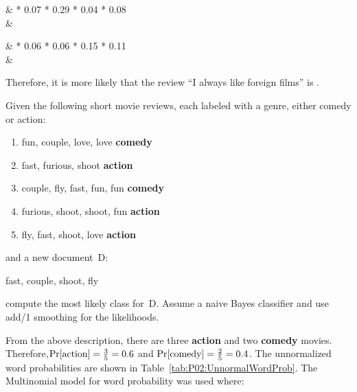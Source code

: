 \begin{aligncustom}
  \Pr{} & * 0.07 * 0.29 * 0.04 * 0.08 \\
                                       &\approx {}
\end{aligncustom}

\begin{aligncustom}
  \Pr{} & * 0.06 * 0.06 * 0.15 * 0.11 \\
                                       &\approx {}
\end{aligncustom}


\noindent
Therefore, it is more likely that the review ``I always like foreign films'' is .

\newpage
\begin{subproblem}\label{P02:B}
Given the following short movie reviews,  each labeled with a genre,  either comedy or action:

\begin{enumerate}
  \item fun, couple, love, love \hspace{6pt}\textbf{comedy}
  \item fast, furious, shoot \hspace{6pt}\textbf{action}
  \item couple, fly, fast, fun, fun \hspace{6pt}\textbf{comedy}
  \item furious, shoot, shoot, fun \hspace{6pt}\textbf{action}
  \item fly, fast, shoot, love \hspace{6pt}\textbf{action}
\end{enumerate}

\noindent
and a new document~D:

\noindent
\hspace{6pt}
fast, couple, shoot, fly

\noindent
compute the most likely class for~D. Assume a naive Bayes classifier and use add\-/1 smoothing for the likelihoods.
\end{subproblem}

From the above description, there are three \textbf{action} and two \textbf{comedy} movies.  Therefore,\linebreak ${\Pr\lbrack\text{action}\rbrack=\frac{3}{5}=0.6}$ and ${\Pr\lbrack\text{comedy}\rbrack=\frac{2}{5}=0.4}$.  The unnormalized word probabilities are shown in Table~\ref{tab:P02:UnnormalWordProb}.  The Multinomial model for word probability was used where:

